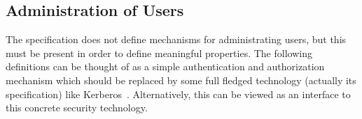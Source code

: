 



\subsection{Administration of Users} \label{sec:users}

\vspace{2ex}

The \corbasec{} specification does not define mechanisms for administrating
users, but this must be present in order to define meaningful properties.  The
following definitions can be thought of as a simple authentication and
authorization mechanism which should be replaced by some full fledged technology
(actually its specification) like Kerberos~\cite{gollmann:computer:1999}.
Alternatively, this can be viewed as an interface to this concrete security
technology.

